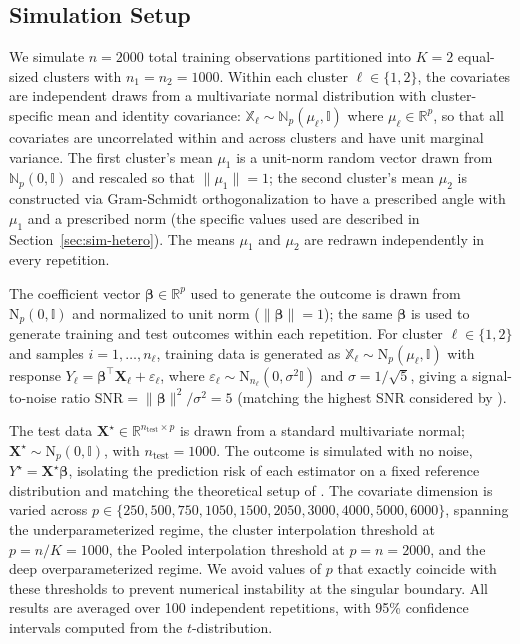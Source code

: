 \documentclass{article}
\theoremstyle{plain}
\theoremstyle{remark}
\def \bX{\mathbf{X}}
\def \bX{\boldsymbol{X}}
\begin{document}
\subsection{Simulation Setup}
\label{sec:sim-setup}

We simulate $n = 2000$ total training observations partitioned into $K = 2$ equal-sized clusters with $n_1 = n_2 = 1000$. Within each cluster $\ell \in \{1, 2\}$, the covariates are independent draws from a multivariate normal distribution with cluster-specific mean and identity covariance: $\mathbb{X}_{\ell} \sim \mathbb{N}_p(\mu_{\ell}, \mathbb{I})$ where $\mu_{\ell} \in \mathbb{R}^p$, 
so that all covariates are uncorrelated within and across clusters and have unit marginal variance. The first cluster's mean $\mu_1$ is a unit-norm random vector drawn from $\mathbb{N}_p(0, \mathbb{I})$ and rescaled so that $\|\mu_1\| = 1$; the second cluster's mean $\mu_2$ is constructed via Gram-Schmidt orthogonalization to have a prescribed angle with $\mu_1$ and a prescribed norm (the specific values used are described in Section~\ref{sec:sim-hetero}). The means $\mu_1$ and $\mu_2$ are redrawn independently in every repetition.


The coefficient vector $\boldsymbol{\beta} \in \mathbb{R}^p$ used to generate the outcome is drawn from $\mathrm{N}_{p}(0,\mathbb{I})$ and normalized to unit norm ($\|\boldsymbol{\beta}\| = 1$); the same $\boldsymbol{\beta}$ is used to generate training and test outcomes within each repetition. For cluster $\ell \in \{1, 2\}$ and samples $i=1,\ldots,n_\ell$, training data is generated as $\mathbb{X}_{\ell} \sim \mathrm{N}_{p}(\mu_{\ell}, \mathbb{I})$ with response $Y_{\ell}=\boldsymbol{\beta}^{\top}\bX_{\ell}+\varepsilon_{\ell}$, where $\varepsilon_{\ell} \sim \mathrm{N}_{n_\ell}(0, \sigma^2\mathbb{I})$ and $\sigma = 1/\sqrt{5}$, giving a signal-to-noise ratio $\mathrm{SNR} = \|\boldsymbol{\beta}\|^2 / \sigma^2 = 5$ (matching the highest SNR considered by \citep{hastie2022surprises}). 

The test data $\bX^{\star} \in \mathbb{R}^{n_{\text{test}} \times p}$ is drawn from a standard multivariate normal; $\bX^{\star} \sim \mathrm{N}_{p}(0, \mathbb{I})$, with $n_{\text{test}} = 1000$. The outcome is simulated with no noise, $Y^{\star} = \bX^{\star} \boldsymbol{\beta}$, isolating the prediction risk of each estimator on a fixed reference distribution and matching the theoretical setup of \citep{hastie2022surprises}. The covariate dimension is varied across $p \in \{250, 500, 750, 1050, 1500, 2050, 3000, 4000, 5000, 6000\}$, spanning the underparameterized regime, the cluster interpolation threshold at $p = n/K = 1000$, the Pooled interpolation threshold at $p = n = 2000$, and the deep overparameterized regime. We avoid values of $p$ that exactly coincide with these thresholds to prevent numerical instability at the singular boundary. All results are averaged over 100 independent repetitions, with 95\% confidence intervals computed from the $t$-distribution.
\end{document}
